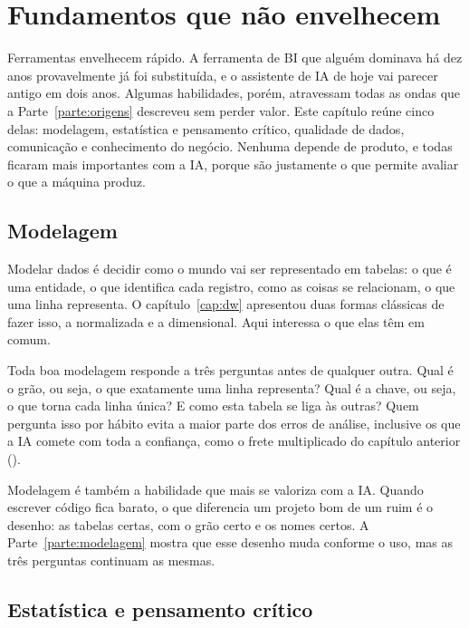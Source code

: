 \chapter{Fundamentos que não envelhecem}
\label{cap:fundamentos}

Ferramentas envelhecem rápido. A ferramenta de BI que alguém dominava há dez anos
provavelmente já foi substituída, e o assistente de IA de hoje vai parecer antigo em dois
anos. Algumas habilidades, porém, atravessam todas as ondas que a Parte~\ref{parte:origens}
descreveu sem perder valor. Este capítulo reúne cinco delas: modelagem, estatística e
pensamento crítico, qualidade de dados, comunicação e conhecimento do negócio. Nenhuma
depende de produto, e todas ficaram mais importantes com a IA, porque são justamente o que
permite avaliar o que a máquina produz.

\section{Modelagem}
\label{sec:fund-modelagem}

Modelar dados é decidir como o mundo vai ser representado em tabelas: o que é uma
entidade, o que identifica cada registro, como as coisas se relacionam, o que uma linha
representa. O capítulo~\ref{cap:dw} apresentou duas formas clássicas de fazer isso, a
normalizada e a dimensional. Aqui interessa o que elas têm em comum.

Toda boa modelagem responde a três perguntas antes de qualquer outra. Qual é o grão, ou
seja, o que exatamente uma linha representa? Qual é a chave, ou seja, o que torna cada
linha única? E como esta tabela se liga às outras? Quem pergunta isso por hábito evita a
maior parte dos erros de análise, inclusive os que a IA comete com toda a confiança, como o
frete multiplicado do capítulo anterior ().

Modelagem é também a habilidade que mais se valoriza com a IA. Quando escrever código fica
barato, o que diferencia um projeto bom de um ruim é o desenho: as tabelas certas, com o
grão certo e os nomes certos. A Parte~\ref{parte:modelagem} mostra que esse desenho muda
conforme o uso, mas as três perguntas continuam as mesmas.

\section{Estatística e pensamento crítico}
\label{sec:fund-estatistica}

